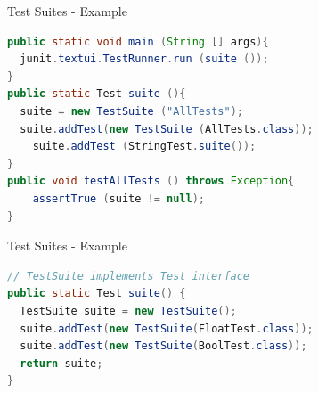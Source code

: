\documentclass[11pt, xcolor=svgnames]{beamer}
\begin{document}

\begin{frame}[fragile]{Test Suites - Example}

\begin{lstlisting}[language=JAVA,basicstyle=\scriptsize]
public static void main (String [] args){
  junit.textui.TestRunner.run (suite ());
}
public static Test suite (){
  suite = new TestSuite ("AllTests");
  suite.addTest(new TestSuite (AllTests.class));
    suite.addTest (StringTest.suite());
}
public void testAllTests () throws Exception{
    assertTrue (suite != null);
}
\end{lstlisting}

\end{frame}



\begin{frame}[fragile]{Test Suites - Example}

\begin{lstlisting}[language=JAVA,basicstyle=\scriptsize]
// TestSuite implements Test interface
public static Test suite() {
  TestSuite suite = new TestSuite();
  suite.addTest(new TestSuite(FloatTest.class));
  suite.addTest(new TestSuite(BoolTest.class));
  return suite;
}
\end{lstlisting}

\end{frame}



\end{document}
